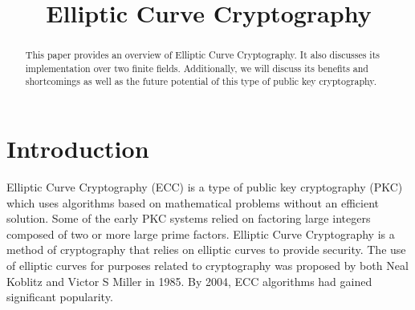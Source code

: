 \documentclass[conference]{IEEEtran}
\begin{document}
\title{Elliptic Curve Cryptography}


\author{
}

\maketitle

\begin{abstract}
This paper provides an overview of Elliptic Curve Cryptography.  It also discusses its implementation over two finite fields.  Additionally, we will discuss its benefits and shortcomings as well as the future potential of this type of public key cryptography.  
\end{abstract}

\text{ }

%
\IEEEpeerreviewmaketitle



\section{Introduction}
Elliptic Curve Cryptography (ECC) is a type of public key cryptography (PKC) which uses algorithms based on mathematical problems without an efficient solution.  Some of the early PKC systems relied on factoring large integers composed of two or more large prime factors.  Elliptic Curve Cryptography is a method of cryptography that relies on elliptic curves to provide security.  The use of elliptic curves for purposes related to cryptography was proposed by both Neal Koblitz and Victor S Miller in 1985.  By 2004, ECC algorithms had gained significant popularity.  

\text{ }
\end{document}
